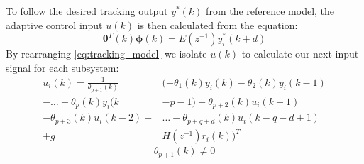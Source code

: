 To follow the desired tracking output $y^*(k)$ from the reference model, the adaptive control input $u(k)$ is then calculated from the equation:
    \begin{equation}
    \label{eq:tracking_model}
	\bm{\theta}^T(k)\bm{\phi}(k)=E(z^{-1})y_i^*(k+d)
	\end{equation}
By rearranging \eqref{eq:tracking_model} we isolate $u(k)$ to calculate our next input signal for each subsystem:
	\begin{align}
	\label{eq:End}
	u_i(k)=\frac{1}{\theta_{p+1}(k)}&(-\theta_1(k)y_i(k)-\theta_2(k)y_i(k-1)  \nonumber \\
    -\dots-\theta_p(k)y_i(k&-p-1)-\theta_{p+2}(k)u_i(k-1)  \\
	-\theta_{p+3}(k)u_i(k-2)-& \dots - \theta_{p+q+d}(k)u_i(k-q-d+1) \nonumber \\
	+g&H(z^{-1})r_i(k))^T \nonumber
	\end{align}
    \begin{equation}
	\theta_{p+1}(k)\neq0 \nonumber
	\end{equation}